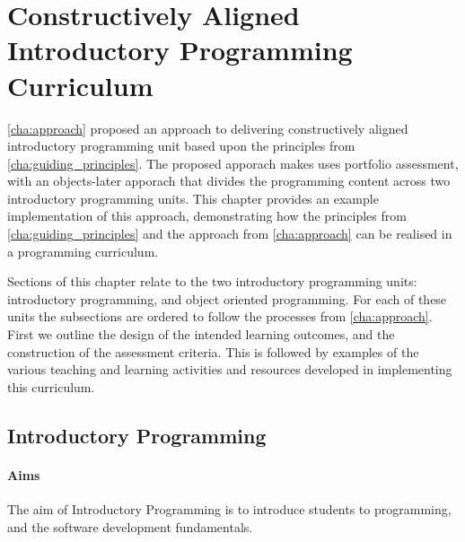 
\chapter{Constructively Aligned Introductory Programming Curriculum} %
\label{cha:example_impl}

\cref{cha:approach} proposed an approach to delivering constructively aligned introductory programming unit based upon the principles from \cref{cha:guiding_principles}. The proposed apporach makes uses portfolio assessment, with an objects-later apporach that divides the programming content across two introductory programming units. This chapter provides an example implementation of this approach, demonstrating how the principles from \cref{cha:guiding_principles} and the approach from \cref{cha:approach} can be realised in a programming curriculum.

Sections of this chapter relate to the two introductory programming units: introductory programming, and object oriented programming. For each of these units the subsections are ordered to follow the processes from \cref{cha:approach}. First we outline the design of the intended learning outcomes, and the construction of the assessment criteria. This is followed by examples of the various teaching and learning activities and resources developed in implementing this curriculum.  


\section{Introductory Programming} %
\label{sec:introductory_programming}

\subsubsection{Aims} %
\label{ssub:intro:aims}

The aim of Introductory Programming is to introduce students to programming, and the software development fundamentals. 

\cite{CSC2013}


